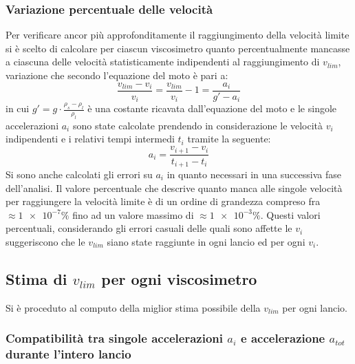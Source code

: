 \documentclass[a4paper,11pt,oneside]{article}
\begin{document}
\subsubsection*{Variazione percentuale delle velocità}
Per verificare ancor più approfonditamente il raggiungimento della velocità limite si è scelto di calcolare per ciascun viscosimetro quanto percentualmente mancasse a ciascuna delle velocità statisticamente indipendenti al raggiungimento di $v_{lim}$, variazione  che secondo l'equazione del moto è pari a:
\begin{equation*}
    \frac{v_{lim} - v_{i}}{v_{i}}=\frac{v_{lim}}{v_i}-1=\frac{a_i}{g' - a_i}
\end{equation*}
in cui $g'=g\cdot\frac{\rho_s-\rho_l}{\rho_l}$ è una costante ricavata dall'equazione del moto e le singole accelerazioni $a_i$ sono state calcolate prendendo in considerazione le velocità $v_{i}$ indipendenti e i relativi tempi intermedi $t_{i}$ tramite la seguente:
\begin{equation*}
    a_i=\frac{v_{i+1}-v_i}{t_{i+1}-t_{i}}
\end{equation*}
Si sono anche calcolati gli errori su $a_{i}$ in quanto necessari in una successiva fase dell'analisi.\newline
Il valore percentuale che descrive quanto manca alle singole velocità per raggiungere la velocità limite è di un ordine di grandezza compreso fra $\approx\num{1e-7}\%$ fino ad un valore massimo di $\approx\num{1e-3}\%$. Questi valori percentuali, considerando gli errori casuali delle quali sono affette le $v_{i}$ suggeriscono che le $v_{lim}$ siano state raggiunte in ogni lancio ed per ogni $v_{i}$.


\subsection{Stima di $v_{lim}$ per ogni viscosimetro}
Si è proceduto al computo della miglior stima possibile della $v_{lim}$ per ogni lancio.
\newpage

\subsubsection*{Compatibilità tra singole accelerazioni $a_i$ e accelerazione $a_{tot}$ durante l'intero lancio}
\end{document}
